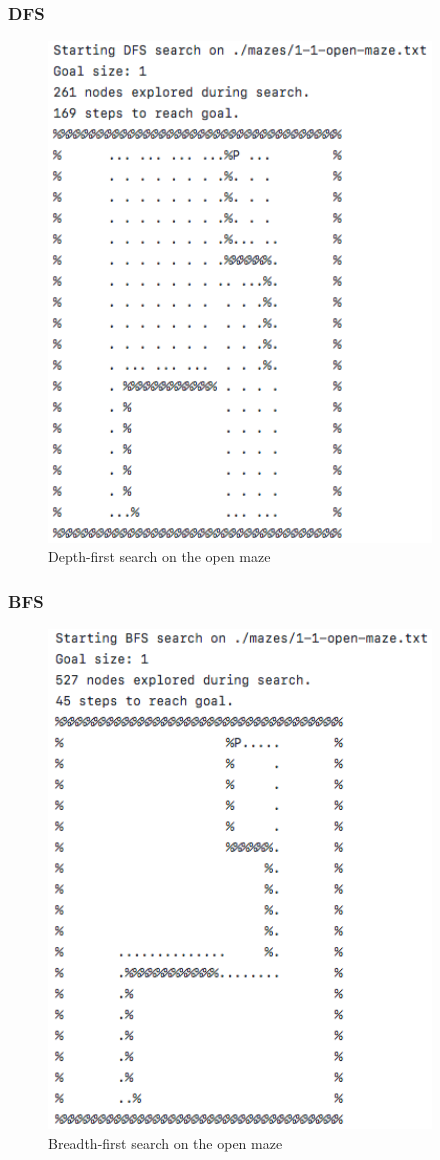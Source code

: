 \documentclass[titlepage]{article}
\begin{document}
\subsubsection*{DFS}
\begin{figure}[h!]
\centering
\includegraphics[width=4in]{dfsopen.png}
\caption{Depth-first search on the open maze}
\label{fig:DFSopen}
\end{figure}

\newpage

\subsubsection*{BFS}
\begin{figure}[h!]
\centering
\includegraphics[width=4in]{bfsopen.png}
\caption{Breadth-first search on the open maze}
\label{fig:BFSopen}
\end{figure}
\end{document}
